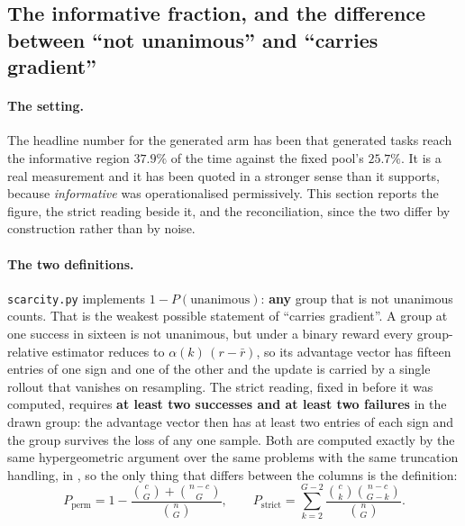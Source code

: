 \subsection{The informative fraction, and the difference between ``not unanimous'' and
``carries gradient''}
\label{sec:strictinformative}

\paragraph{The setting.} The headline number for the generated arm has been that generated
tasks reach the informative region $37.9\%$ of the time against the fixed pool's $25.7\%$. It
is a real measurement and it has been quoted in a stronger sense than it supports, because
\emph{informative} was operationalised permissively. This section reports the figure, the
strict reading beside it, and the reconciliation, since the two differ by construction rather
than by noise.

\paragraph{The two definitions.} \texttt{scarcity.py} implements
$1 - P(\text{unanimous})$: \textbf{any} group that is not unanimous counts. That is the weakest
possible statement of ``carries gradient''. A group at one success in sixteen is not unanimous,
but under a binary reward every group-relative estimator reduces to
$\alpha(k)\,(r - \bar r)$, so its advantage vector has fifteen entries of one sign and one of
the other and the update is carried by a single rollout that vanishes on resampling. The
strict reading, fixed in  before it was computed,
requires \textbf{at least two successes and at least two failures} in the drawn group: the
advantage vector then has at least two entries of each sign and the group survives the loss of
any one sample. Both are computed exactly by the same hypergeometric argument over the same
problems with the same truncation handling, in , so the only
thing that differs between the columns is the definition:
\[
P_{\text{perm}} = 1 - \frac{\binom{c}{G} + \binom{n-c}{G}}{\binom{n}{G}},
\qquad
P_{\text{strict}} = \sum_{k=2}^{G-2}\frac{\binom{c}{k}\binom{n-c}{G-k}}{\binom{n}{G}} .
\]

